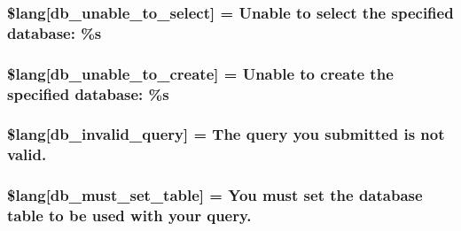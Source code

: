 \subsubsection[{\$lang}]{\setlength{\rightskip}{0pt plus 5cm}\$lang\mbox{[}\textquotesingle{}db\+\_\+unable\+\_\+to\+\_\+select\textquotesingle{}\mbox{]} = \textquotesingle{}Unable to select the specified database\+: \%s\textquotesingle{}}\label{system_2language_2english_2db__lang_8php_a3c93974df838c0e036690874108715ea}
\hypertarget{system_2language_2english_2db__lang_8php_a4266e3b235feb16d9cf2e88afd1fedac}{}
\subsubsection[{\$lang}]{\setlength{\rightskip}{0pt plus 5cm}\$lang\mbox{[}\textquotesingle{}db\+\_\+unable\+\_\+to\+\_\+create\textquotesingle{}\mbox{]} = \textquotesingle{}Unable to create the specified database\+: \%s\textquotesingle{}}\label{system_2language_2english_2db__lang_8php_a4266e3b235feb16d9cf2e88afd1fedac}
\hypertarget{system_2language_2english_2db__lang_8php_a2cbf4ee929f45a29a0dcf21280bad485}{}
\subsubsection[{\$lang}]{\setlength{\rightskip}{0pt plus 5cm}\$lang\mbox{[}\textquotesingle{}db\+\_\+invalid\+\_\+query\textquotesingle{}\mbox{]} = \textquotesingle{}The query you submitted is not valid.\textquotesingle{}}\label{system_2language_2english_2db__lang_8php_a2cbf4ee929f45a29a0dcf21280bad485}
\hypertarget{system_2language_2english_2db__lang_8php_a0f5d469f071f2b5327b44761f4a06396}{}
\subsubsection[{\$lang}]{\setlength{\rightskip}{0pt plus 5cm}\$lang\mbox{[}\textquotesingle{}db\+\_\+must\+\_\+set\+\_\+table\textquotesingle{}\mbox{]} = \textquotesingle{}You must set the database table to be used with your query.\textquotesingle{}}\label{system_2language_2english_2db__lang_8php_a0f5d469f071f2b5327b44761f4a06396}
\hypertarget{system_2language_2english_2db__lang_8php_a55e22fb14cedc8ee7f70980bf7f37308}{}
